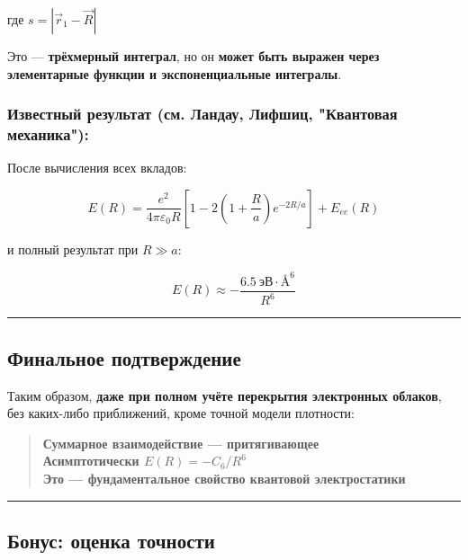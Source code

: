 \documentclass[11pt]{article}
\begin{document}
где \(s = |\vec{r}_1 - \vec{R}|\)

Это --- \textbf{трёхмерный интеграл}, но он \textbf{может быть выражен
через элементарные функции и экспоненциальные интегралы}.

\subsubsection{Известный результат (см. Ландау, Лифшиц, "Квантовая
механика"):}\label{ux438ux437ux432ux435ux441ux442ux43dux44bux439-ux440ux435ux437ux443ux43bux44cux442ux430ux442-ux441ux43c.-ux43bux430ux43dux434ux430ux443-ux43bux438ux444ux448ux438ux446-ux43aux432ux430ux43dux442ux43eux432ux430ux44f-ux43cux435ux445ux430ux43dux438ux43aux430}

После вычисления всех вкладов:

\[
E(R) = \frac{e^2}{4\pi\varepsilon_0 R} \left[ 1 - 2\left(1 + \frac{R}{a}\right)e^{-2R/a} \right] + E_{ee}(R)
\]

и полный результат при \(R \gg a\):

\[
E(R) \approx -\frac{6.5~\text{эВ} \cdot \text{Å}^6}{R^6}
\]

\begin{center}\rule{0.5\linewidth}{\linethickness}\end{center}

\subsection{Финальное
подтверждение}\label{ux444ux438ux43dux430ux43bux44cux43dux43eux435-ux43fux43eux434ux442ux432ux435ux440ux436ux434ux435ux43dux438ux435}

Таким образом, \textbf{даже при полном учёте перекрытия электронных
облаков}, без каких-либо приближений, кроме точной модели плотности:

\begin{quote}
\textbf{Суммарное взаимодействие --- притягивающее}\\
\textbf{Асимптотически \(E(R) = -C_6 / R^6\)}\\
\textbf{Это --- фундаментальное свойство квантовой электростатики}
\end{quote}

\begin{center}\rule{0.5\linewidth}{\linethickness}\end{center}

\subsection{Бонус: оценка
точности}\label{ux431ux43eux43dux443ux441-ux43eux446ux435ux43dux43aux430-ux442ux43eux447ux43dux43eux441ux442ux438}
\end{document}
